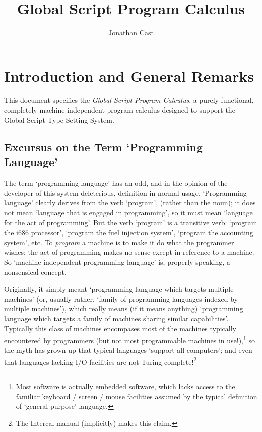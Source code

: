 \documentclass{report}
\title{Global Script Program Calculus}
\author{Jonathan Cast}
\newcommand\defn[1]{\emph{#1}}
\begin{document}
\maketitle

\tableofcontents

\chapter{Introduction and General Remarks}

This document specifies the \defn{Global Script Program Calculus}, a purely-functional, completely machine-independent program calculus designed to support the Global Script Type-Setting System.

\section{Excursus on the Term `Programming Language'}

The term `programming language' has an odd, and in the opinion of the developer of this system deleterious, definition in normal usage.
`Programming language' clearly derives from the verb `program', (rather than the noun);
it does not mean `language that is engaged in programming', so it must mean `language for the act of programming'.
But the verb `program' is a transitive verb: `program the i686 processor', `program the fuel injection system', `program the accounting system', etc.
To \defn{program} a machine is to make it do what the programmer wishes;
the act of programming makes no sense except in reference to a machine.
So `machine-independent programming language' is, properly speaking, a nonsensical concept.

Originally, it simply meant `programming language which targets multiple machines'
(or, usually rather, `family of programming languages indexed by multiple machines'),
which really means (if it means anything) `programming language which targets a family of machines sharing similar capabilities'.
Typically this class of machines encompases most of the machines typically encountered by programmers
(but not most programmable machines in use!),\footnote{Most software is actually embedded software, which lacks access to the familiar keyboard / screen / mouse facilities assumed by the typical definition of `general-purpose' language.}
so the myth has grown up that typical languages `support all computers';
and even that languages lacking I/O facilities are not Turing-complete!\footnote{The Intercal manual (implicitly) makes this claim.}
\end{document}
